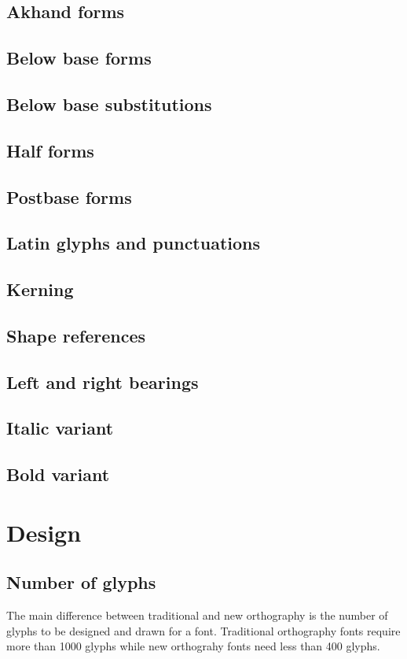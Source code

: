 \subsection {Akhand forms}
\subsection {Below base forms}
\subsection {Below base substitutions}
\subsection {Half forms}
\subsection {Postbase forms}
\subsection {Latin glyphs and punctuations}
\subsection {Kerning}
\subsection {Shape references}
\subsection {Left and right bearings}
\subsection {Italic variant}
\subsection {Bold variant}

\section{Design}
\subsection{Number of glyphs}

The main difference between traditional and new orthography is the number of
glyphs to be designed and drawn for a font.
Traditional orthography fonts require more than 1000 glyphs while new orthograhy
fonts need less than 400 glyphs.

